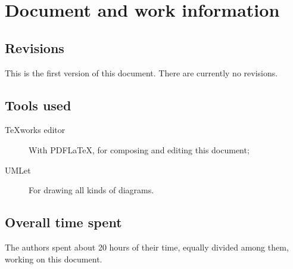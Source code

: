 \chapter{Document and work information}

\section{Revisions}
This is the first version of this document. There are currently no revisions.

\section{Tools used}
\begin{description}
\item[TeXworks editor] With PDF\LaTeX{}, for composing and editing this document;
\item[UMLet] For drawing all kinds of diagrams.
\end{description}

\section{Overall time spent}
The authors spent about 20 hours of their time, equally divided among them, working on this document.